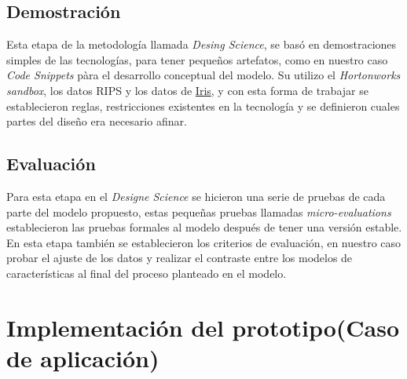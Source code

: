 \subsection{Demostración}
Esta etapa de la metodología llamada \textit{Desing Science}, se basó en demostraciones simples de las tecnologías, para tener pequeños artefatos, como en nuestro caso \textit{Code Snippets} pàra el desarrollo conceptual del modelo. Su utilizo el \textit{Hortonworks sandbox}, los datos RIPS y los datos de \href{http://archive.ics.uci.edu/ml/datasets/Iris}{Iris}, y con esta forma de trabajar se establecieron reglas, restricciones existentes en la tecnología y se definieron cuales partes del diseño era necesario afinar.
\subsection{Evaluación}
Para esta etapa en el \textit{Designe Science} se hicieron una serie de pruebas de cada parte del modelo propuesto, estas pequeñas pruebas llamadas \textit{micro-evaluations} establecieron las pruebas formales al modelo después de tener una versión estable. En esta etapa también se establecieron los criterios de evaluación, en nuestro caso probar el ajuste de los datos y realizar el contraste entre los modelos de características al final del proceso planteado en el modelo. 

\section{Implementación del prototipo(Caso de aplicación)}

